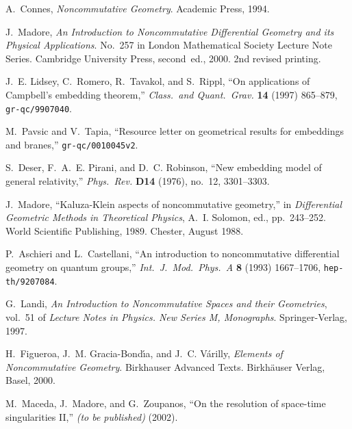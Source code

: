 \documentclass[12pt,a4paper]{article}
\newcounter{theorem}
\newcounter{eg}
\begin{document}
\providecommand{\href}[2]{#2}\begingroup\raggedright\begin{thebibliography}{10}

A.~Connes, {\em Noncommutative Geometry}.
\newblock Academic Press, 1994.

J.~Madore, {\em An Introduction to Noncommutative Differential Geometry and its
  Physical Applications}.
\newblock No.~257 in London Mathematical Society Lecture Note Series. Cambridge
  University Press, second~ed., 2000.
\newblock 2nd revised printing.

J.~E. Lidsey, C.~Romero, R.~Tavakol, and S.~Rippl, ``On applications of
  {C}ampbell's embedding theorem,'' {\em Class.\ and Quant.\ Grav.} {\bf 14}
  (1997) 865--879,
\href{http://xxx.lanl.gov/abs/gr-qc/9907040}{{\tt gr-qc/9907040}}.

M.~Pavsic and V.~Tapia, ``Resource letter on geometrical results for embeddings
  and branes,''
\href{http://xxx.lanl.gov/abs/gr-qc/0010045v2}{{\tt gr-qc/0010045v2}}.

S.~Deser, F.~A.~E. Pirani, and D.~C. Robinson, ``New embedding model of general
  relativity,'' {\em Phys.\ Rev.} {\bf D14} (1976), no.~12, 3301--3303.

J.~Madore, ``{K}aluza-{K}lein aspects of noncommutative geometry,'' in {\em
  Differential Geometric Methods in Theoretical Physics}, A.~I. Solomon, ed.,
  pp.~243--252.
\newblock World Scientific Publishing, 1989.
\newblock Chester, August 1988.

P.~Aschieri and L.~Castellani, ``An introduction to noncommutative differential
  geometry on quantum groups,'' {\em Int.\ J.~Mod.\ Phys.~A} {\bf 8} (1993)
  1667--1706,
\href{http://xxx.lanl.gov/abs/hep-th/9207084}{{\tt hep-th/9207084}}.

G.~Landi, {\em An Introduction to Noncommutative Spaces and their Geometries},
  vol.~51 of {\em Lecture Notes in Physics. New Series M, Monographs}.
\newblock Springer-Verlag, 1997.

H.~Figueroa, J.~M. Gracia-Bond{\'\i a}, and J.~C. V{\'a}rilly, {\em Elements of
  Noncommutative Geometry}.
\newblock Birkhauser Advanced Texts. Birkh{\"a}user Verlag, Basel, 2000.

M.~Maceda, J.~Madore, and G.~Zoupanos, ``On the resolution of space-time
  singularities {II},'' {\em (to be published)} (2002).


\end{thebibliography}
\end{document}
